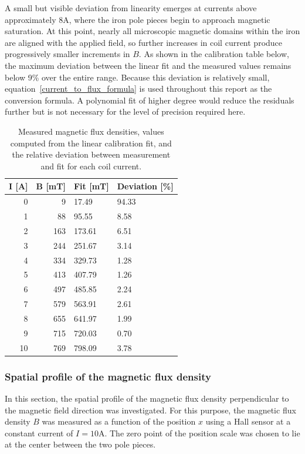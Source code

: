 \documentclass{article}
\begin{document}
A small but visible deviation from linearity emerges at currents above approximately 8A, where the iron pole pieces begin to approach magnetic saturation. At this point, nearly all microscopic magnetic domains within the iron are aligned with the applied field, so further increases in coil current produce progressively smaller increments in $B$. As shown in the calibration table below, the maximum deviation between the linear fit and the measured values remains below 9\% over the entire range. Because this deviation is relatively small, equation~\eqref{current_to_flux_formula} is used throughout this report as the conversion formula. A polynomial fit of higher degree would reduce the residuals further but is not necessary for the level of precision required here.

\begin{table}[!ht]
    \centering
    \begin{tabular}{rrll}
    \hline
        \textbf{I [A]} & \textbf{B [mT]} & \textbf{Fit [mT]} & \textbf{Deviation [\%]} \\ \hline \hline
        0 & 9 & 17.49 & 94.33 \\ \hline
        1 & 88 & 95.55 & 8.58 \\ \hline
        2 & 163 & 173.61 & 6.51 \\ \hline
        3 & 244 & 251.67 & 3.14 \\ \hline
        4 & 334 & 329.73 & 1.28 \\ \hline
        5 & 413 & 407.79 & 1.26 \\ \hline
        6 & 497 & 485.85 & 2.24 \\ \hline
        7 & 579 & 563.91 & 2.61 \\ \hline
        8 & 655 & 641.97 & 1.99 \\ \hline
        9 & 715 & 720.03 & 0.70 \\ \hline
        10 & 769 & 798.09 & 3.78 \\ \hline
    \end{tabular}
    \caption{Measured magnetic flux densities, values computed from the linear calibration fit, and the relative deviation between measurement and fit for each coil current.}
\end{table}

\subsubsection{Spatial profile of the magnetic flux density}

In this section, the spatial profile of the magnetic flux density perpendicular to the magnetic field direction was investigated. For this purpose, the magnetic flux density $B$ was measured as a function of the position $x$ using a Hall sensor at a constant current of $I = 10$A. The zero point of the position scale was chosen to lie at the center between the two pole pieces.
\end{document}
